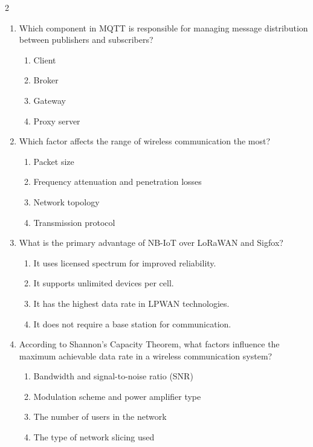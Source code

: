 \begin{multicols}{2}
\begin{enumerate}
    \item Which component in MQTT is responsible for managing message distribution between publishers and subscribers? 
    \begin{enumerate}
    \item Client
    \item Broker
    \item Gateway
    \item Proxy server
    \end{enumerate}

    \item Which factor affects the range of wireless communication the most?
\begin{enumerate}
\item Packet size 
\item Frequency attenuation and penetration losses 
\item Network topology 
\item Transmission protocol 
\end{enumerate}

    \item What is the primary advantage of NB-IoT over LoRaWAN and Sigfox?
\begin{enumerate}
\item It uses licensed spectrum for improved reliability. 
\item It supports unlimited devices per cell.
\item It has the highest data rate in LPWAN technologies.
\item It does not require a base station for communication.
\end{enumerate}
\item According to Shannon’s Capacity Theorem, what factors influence the maximum achievable data rate in a wireless communication system?
\begin{enumerate}
    \item Bandwidth and signal-to-noise ratio (SNR)
    \item Modulation scheme and power amplifier type
    \item The number of users in the network
    \item The type of network slicing used
\end{enumerate}


\end{enumerate}
\end{multicols}
